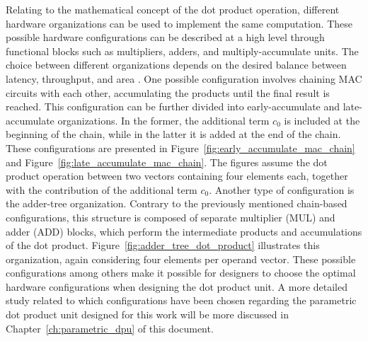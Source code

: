 Relating to the mathematical concept of the dot product operation, different hardware organizations can be used to implement the same computation. These possible hardware configurations can be described at a high level through functional blocks such as multipliers, adders, and multiply-accumulate units. The choice between different organizations depends on the desired balance between latency, throughput, and area \cite{hickmann2019matrixfunctionalunits}.
One possible configuration involves chaining MAC circuits with each other, accumulating the products until the final result is reached. This configuration can be further divided into early-accumulate and late-accumulate organizations. In the former, the additional term $c_0$ is included at the beginning of the chain, while in the latter it is added at the end of the chain. These configurations are presented in Figure~\ref{fig:early_accumulate_mac_chain} and Figure~\ref{fig:late_accumulate_mac_chain}. The figures assume the dot product operation between two vectors containing four elements each, together with the contribution of the additional term $c_0$.
Another type of configuration is the adder-tree organization. Contrary to the previously mentioned chain-based configurations, this structure is composed of separate multiplier (MUL) and adder (ADD) blocks, which perform the intermediate products and accumulations of the dot product. Figure~\ref{fig:adder_tree_dot_product} illustrates this organization, again considering four elements per operand vector.
These possible configurations among others make it possible for designers to choose the optimal hardware configurations when designing the dot product unit. A more detailed study related to which configurations have been chosen regarding the parametric dot product unit designed for this work will be more discussed in Chapter~\ref{ch:parametric_dpu} of this document.
\newpage
